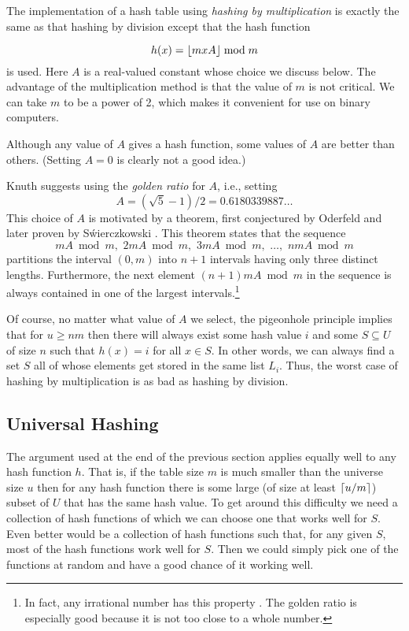 The implementation of a hash table using \emph{hashing by
multiplication} is exactly the same as that hashing by division
except that the hash function 

\[
  h(x) = \lfloor mxA \rfloor \bmod m
\]
is used.  Here $A$ is a real-valued constant whose choice we discuss
below. The advantage of the multiplication method is that the value of
$m$ is not critical.  We can take $m$ to be a power of 2, which makes
it convenient for use on binary computers. 

Although any value of $A$ gives a hash function, some values of $A$
are better than others.  (Setting $A=0$ is clearly not a good idea.)

Knuth \cite{k97} suggests using the \emph{golden ratio} for $A$, i.e.,
setting 
\[  
    A=(\sqrt{5}-1)/2=0.6180339887\ldots
\]   
This choice of $A$ is motivated by a theorem, first conjectured by
Oderfeld and later proven by S\'wierczkowski \cite{s58}.  This theorem
states that the sequence 
\[
     mA \bmod m,\,\, 2mA \bmod m,\,\, 3mA \bmod m,\,\,\ldots,\,\, nmA\bmod m
\] 
partitions the interval $(0,m)$ into $n+1$ intervals having only three
distinct lengths.  Furthermore, the next element $(n+1)mA\bmod m$ in
the sequence is always contained in one of the largest
intervals.\footnote{In fact, any irrational number has this property
\cite{sos57}.  The golden ratio is especially good because it is
not too close to a whole number.}

Of course, no matter what value of $A$ we select, the pigeonhole
principle implies that for $u\ge nm$ then there will always exist some
hash value $i$ and some $S\subseteq U$ of size $n$ such that $h(x)=i$
for all $x\in S$.  In other words, we can always find a set $S$ all of
whose elements get stored in the same list $L_i$. Thus, the worst case
of hashing by multiplication is as bad as hashing by division.


\subsection{Universal Hashing}
\label{hash:sec:universal}

The argument used at the end of the previous section applies equally
well to any hash function $h$.  That is, if the table size $m$ is much
smaller than the universe size $u$ then for any hash function there is
some large (of size at least $\lceil u/m \rceil$) subset of $U$ that has the
same hash value.  To get around this difficulty we need a collection
of hash functions of which we can choose one that works well for $S$.
Even better would be a collection of hash functions such that, for any
given $S$, most of the hash functions work well for $S$.  Then we
could simply pick one of the functions at random and have a good
chance of it working well.

